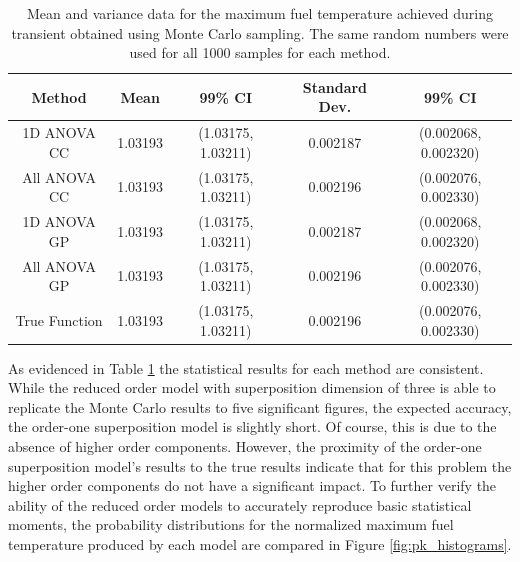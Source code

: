 \begin{table}[!htb] 
\caption{\label{table:pk_mean_variance} 
Mean and variance data for the maximum fuel temperature achieved during transient obtained using Monte Carlo sampling. The same random numbers were used for all 1000 samples for each method.}
\centering
\small
\begin{tabular}{||c|c|c|c|c||} 
\hline \hline
\textbf{Method} & \textbf{Mean} & \textbf{99\% CI} & \textbf{Standard Dev.} & \textbf{99\% CI} \\ \hline
1D ANOVA CC  & 1.03193 & (1.03175, 1.03211) & 0.002187 & (0.002068, 0.002320) \\ \hline
All ANOVA CC & 1.03193 & (1.03175, 1.03211) & 0.002196 & (0.002076, 0.002330) \\ \hline
1D ANOVA GP  & 1.03193 & (1.03175, 1.03211) & 0.002187 & (0.002068, 0.002320) \\ \hline
All ANOVA GP & 1.03193 & (1.03175, 1.03211) & 0.002196 & (0.002076, 0.002330) \\ \hline
True Function & 1.03193 & (1.03175, 1.03211) & 0.002196 & (0.002076, 0.002330) \\ 
\hline \hline
\end{tabular}
\end{table}
As evidenced in Table \ref{table:pk_mean_variance} the statistical results for each method are consistent. While the reduced order model with superposition dimension of three is able to replicate the Monte Carlo results to five significant figures, the expected accuracy, the order-one superposition model is slightly short. Of course, this is due to the absence of higher order components. However, the proximity of the order-one superposition model's results to the true results indicate that for this problem the higher order components do not have a significant impact. To further verify the ability of the reduced order models to accurately reproduce basic statistical moments, the probability distributions for the normalized maximum fuel temperature produced by each model are compared in Figure \ref{fig:pk_histograms}. 
